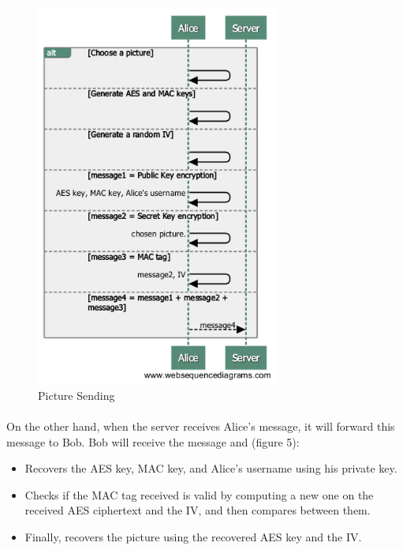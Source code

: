 	    \begin{figure}[H]
	    
	      \centering
	      \includegraphics[width=8cm]{images/architecture/picture_sending}
	      \caption{Picture Sending}
	      \label{Figure 4}
	     
	    \end{figure}
	    
	    \paragraph{}
	      On the other hand, when the server receives Alice's message, it will forward this message to Bob. Bob will receive the message and (figure 5):
	      \begin{itemize}
	       \item Recovers the AES key, MAC key, and Alice's username using his private key.
	       \item Checks if the MAC tag received is valid by computing a new one on the received AES ciphertext and the IV, and then compares between them.
	       \item Finally, recovers the picture using the recovered AES key and the IV.
	      \end{itemize}

	    
	    
